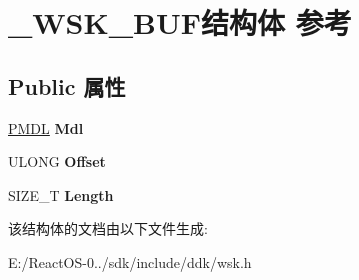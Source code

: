 \hypertarget{struct___w_s_k___b_u_f}{}\section{\+\_\+\+W\+S\+K\+\_\+\+B\+U\+F结构体 参考}
\label{struct___w_s_k___b_u_f}
\subsection*{Public 属性}
\begin{DoxyCompactItemize}
\item 
\mbox{\label{struct___w_s_k___b_u_f_a39284f5ce42d0525413435b94bf47a5c}} 
\hyperlink{interfacevoid}{P\+M\+DL} {\bfseries Mdl}
\item 
\mbox{\label{struct___w_s_k___b_u_f_a6c0dab1ca0d5ad99c7cca817f5f12f7d}} 
U\+L\+O\+NG {\bfseries Offset}
\item 
\mbox{\label{struct___w_s_k___b_u_f_a3806da5949da76158ba7019fd257dfc1}} 
S\+I\+Z\+E\+\_\+T {\bfseries Length}
\end{DoxyCompactItemize}


该结构体的文档由以下文件生成\+:\begin{DoxyCompactItemize}
\item 
E\+:/\+React\+O\+S-\/0../sdk/include/ddk/wsk.\+h\end{DoxyCompactItemize}
